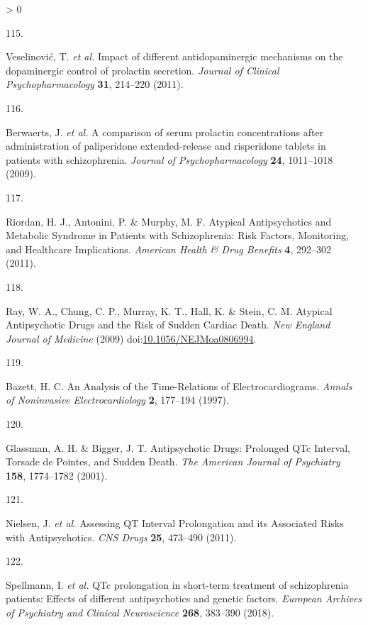 \documentclass[
  9pt,
  english,
  ,jou,floatsintext]{apa6}
\newlength{\cslhangindent}
\newlength{\csllabelwidth}
\newenvironment{CSLReferences}[2] %
 {%
  \setlength{\parindent}{0pt}
  \ifodd #1 \everypar{\setlength{\hangindent}{\cslhangindent}}\ignorespaces\fi
  \ifnum #2 > 0
  \setlength{\parskip}{#2\baselineskip}
  \fi
 }%
 {}
\newcommand{\CSLLeftMargin}[1]{\parbox[t]{\csllabelwidth}{#1}}
\newcommand{\CSLRightInline}[1]{\parbox[t]{\linewidth - \csllabelwidth}{#1}\break}
\begin{document}
\begin{CSLReferences}{0}{0}
\leavevmode\hypertarget{ref-Veselinovic2011}{}%
\CSLLeftMargin{115. }
\CSLRightInline{Veselinović, T. \emph{et al.} Impact of different antidopaminergic mechanisms on the dopaminergic control of prolactin secretion. \emph{Journal of Clinical Psychopharmacology} \textbf{31}, 214--220 (2011).}

\leavevmode\hypertarget{ref-Berwaerts2009}{}%
\CSLLeftMargin{116. }
\CSLRightInline{Berwaerts, J. \emph{et al.} A comparison of serum prolactin concentrations after administration of paliperidone extended-release and risperidone tablets in patients with schizophrenia. \emph{Journal of Psychopharmacology} \textbf{24}, 1011--1018 (2009).}

\leavevmode\hypertarget{ref-Riordan2011}{}%
\CSLLeftMargin{117. }
\CSLRightInline{Riordan, H. J., Antonini, P. \& Murphy, M. F. Atypical {Antipsychotics} and {Metabolic} {Syndrome} in {Patients} with {Schizophrenia}: {Risk} {Factors}, {Monitoring}, and {Healthcare} {Implications}. \emph{American Health \& Drug Benefits} \textbf{4}, 292--302 (2011).}

\leavevmode\hypertarget{ref-Ray2009}{}%
\CSLLeftMargin{118. }
\CSLRightInline{Ray, W. A., Chung, C. P., Murray, K. T., Hall, K. \& Stein, C. M. {Atypical Antipsychotic Drugs and the Risk of Sudden Cardiac Death}. \emph{New England Journal of Medicine} (2009) doi:\href{https://doi.org/10.1056/NEJMoa0806994}{10.1056/NEJMoa0806994}.}

\leavevmode\hypertarget{ref-Bazett1997}{}%
\CSLLeftMargin{119. }
\CSLRightInline{Bazett, H. C. An {Analysis} of the {Time}-{Relations} of {Electrocardiograms}. \emph{Annals of Noninvasive Electrocardiology} \textbf{2}, 177--194 (1997).}

\leavevmode\hypertarget{ref-Glassman2001}{}%
\CSLLeftMargin{120. }
\CSLRightInline{Glassman, A. H. \& Bigger, J. T. Antipsychotic {Drugs}: {Prolonged} {QTc} {Interval}, {Torsade} de {Pointes}, and {Sudden} {Death}. \emph{The American Journal of Psychiatry} \textbf{158}, 1774--1782 (2001).}

\leavevmode\hypertarget{ref-Nielsen2011}{}%
\CSLLeftMargin{121. }
\CSLRightInline{Nielsen, J. \emph{et al.} Assessing {QT} {Interval} {Prolongation} and its {Associated} {Risks} with {Antipsychotics}. \emph{CNS Drugs} \textbf{25}, 473--490 (2011).}

\leavevmode\hypertarget{ref-Spellmann2018}{}%
\CSLLeftMargin{122. }
\CSLRightInline{Spellmann, I. \emph{et al.} {QTc} prolongation in short-term treatment of schizophrenia patients: Effects of different antipsychotics and genetic factors. \emph{European Archives of Psychiatry and Clinical Neuroscience} \textbf{268}, 383--390 (2018).}


\end{CSLReferences}
\end{document}
